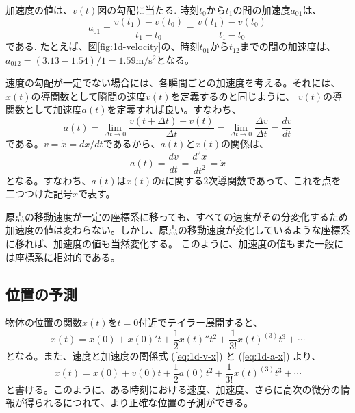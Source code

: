 \documentclass[a4paper, uplatex]{jsarticle}
\numberwithin{equation}{section}
\numberwithin{figure}{section}
\numberwithin{table}{section}
\begin{document}
加速度の値は、\(v(t)\)図の勾配に当たる. 時刻\(t_0\)から\(t_1\)の間の加速度\(a_{01}\)は、
\begin{equation}
  a_{01} = \frac{v(t_1) - v(t_0)}{t_1 - t_0} = \frac{v(t_1) - v(t_0)}{t_1 - t_0}
  \label{eq:1d-acceleration}
\end{equation}
である. たとえば、図\ref{fig:1d-velocity}の、時刻\(t_{01}\)から\(t_{12}\)までの間の加速度は、
\(a_{012} = (3.13 - 1.54)/1 = 1.59\mathrm{m/s^2}\)となる。

速度の勾配が一定でない場合には、各瞬間ごとの加速度を考える。それには、\(x(t)\)の導関数として瞬間の速度\(v(t)\)を定義するのと同じように、
\(v(t)\)の導関数として加速度\(a(t)\)を定義すれば良い。すなわち、
\begin{equation}
  a(t) = \lim_{\Delta t \to 0} \frac{v(t + \Delta t) - v(t)}{\Delta t} = \lim_{\Delta t \to 0} \frac{\Delta v}{\Delta t} = \frac{dv}{dt}
  \label{eq:1d-acceleration-function}
\end{equation}
である。\(v=\dot{x}=dx/dt\)であるから、\(a(t)\)と\(x(t)\)の関係は、
\begin{equation}
  a(t) = \frac{dv}{dt} = \frac{d^2x}{dt^2} = \ddot{x}
  \label{eq:1d-a-x}
\end{equation}
となる。すなわち、\(a(t)\)は\(x(t)\)の\(t\)に関する2次導関数であって、これを点を二つつけた記号\(\ddot{x}\)で表す。

原点の移動速度が一定の座標系に移っても、すべての速度がその分変化するため加速度の値は変わらない。しかし、原点の移動速度が変化しているような座標系に移れば、加速度の値も当然変化する。
このように、加速度の値もまた一般には座標系に相対的である。

\subsection{位置の予測}
物体の位置の関数\(x(t)\)を\(t=0\)付近でテイラー展開すると、
\begin{equation}
  x(t) = x(0) + x(0)'t + \frac{1}{2}x(t)''t^2 + \frac{1}{3!}x(t)^{(3)}t^3 + \cdots
  \label{eq:1d-taylor}
\end{equation}
となる。また、速度と加速度の関係式 (\ref{eq:1d-v-x}) と (\ref{eq:1d-a-x}) より、
\begin{equation}
  x(t) = x(0) + v(0)t + \frac{1}{2}a(0)t^2 + \frac{1}{3!}x(t)^{(3)}t^3 + \cdots
  \label{eq:1d-taylor-2}
\end{equation}
と書ける。このように、ある時刻における速度、加速度、さらに高次の微分の情報が得られるにつれて、より正確な位置の予測ができる。
\end{document}
